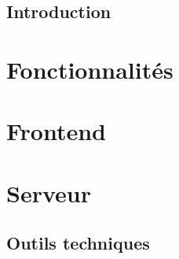 

\subsection{Introduction}


\section*{Fonctionnalités}
\subsection{}






\section*{Frontend}
\subsection{}

\subsection{}


\section*{Serveur}
\subsection{}


\subsection{Outils techniques}


